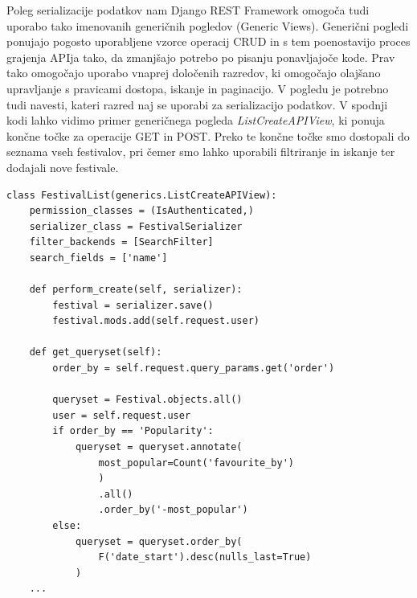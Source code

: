 \documentclass[a4paper,12pt,openright]{book}
\begin{document}
Poleg serializacije podatkov nam Django REST Framework omogoča tudi uporabo tako imenovanih generičnih pogledov (Generic Views).
Generični pogledi ponujajo pogosto uporabljene vzorce operacij CRUD in s tem poenostavijo proces grajenja APIja tako, da zmanjšajo potrebo po pisanju ponavljajoče kode.
Prav tako omogočajo uporabo vnaprej določenih razredov, ki omogočajo olajšano upravljanje s pravicami dostopa, iskanje in paginacijo.
V pogledu je potrebno tudi navesti, kateri razred naj se uporabi za serializacijo podatkov.
V spodnji kodi lahko vidimo primer generičnega pogleda \textit{ListCreateAPIView}, ki ponuja končne točke za operacije GET in POST.
Preko te končne točke smo dostopali do seznama vseh festivalov, pri čemer smo lahko uporabili filtriranje in iskanje ter dodajali nove festivale.
\begin{lstlisting}[label=code3,caption=Primer pogleda za model \textit{Festival}\, ki omogoča kreiranje\, iskanje in vračanje festivalov urejenih po popularnosti in datumu.,frame=tb,captionpos=b]
class FestivalList(generics.ListCreateAPIView):
    permission_classes = (IsAuthenticated,)
    serializer_class = FestivalSerializer
    filter_backends = [SearchFilter]
    search_fields = ['name']

    def perform_create(self, serializer):
        festival = serializer.save()
        festival.mods.add(self.request.user)

    def get_queryset(self):
        order_by = self.request.query_params.get('order')

        queryset = Festival.objects.all()
        user = self.request.user
        if order_by == 'Popularity':
            queryset = queryset.annotate(
                most_popular=Count('favourite_by')
                )
                .all()
                .order_by('-most_popular')
        else:
            queryset = queryset.order_by(
                F('date_start').desc(nulls_last=True)
            )
    ...
\end{lstlisting}
\end{document}

